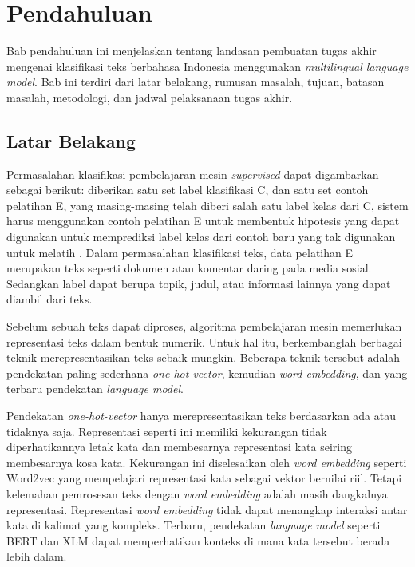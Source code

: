 \chapter{Pendahuluan}

Bab pendahuluan ini menjelaskan tentang landasan pembuatan tugas akhir mengenai klasifikasi teks berbahasa Indonesia menggunakan \textit{multilingual language model}. Bab ini terdiri dari latar belakang, rumusan masalah, tujuan, batasan masalah, metodologi, dan jadwal pelaksanaan tugas akhir.

\section{Latar Belakang}

Permasalahan klasifikasi pembelajaran mesin \textit{supervised} dapat digambarkan sebagai berikut: diberikan satu set label klasifikasi C, dan satu set contoh pelatihan E, yang masing-masing telah diberi salah satu label kelas dari C, sistem harus menggunakan contoh pelatihan E untuk membentuk hipotesis yang dapat digunakan untuk memprediksi label kelas dari contoh baru yang tak digunakan untuk melatih \parencite{mitchell_machine_1997}. Dalam permasalahan klasifikasi teks, data pelatihan E merupakan teks seperti dokumen atau komentar daring pada media sosial. Sedangkan label dapat berupa topik, judul, atau informasi lainnya yang dapat diambil dari teks.

Sebelum sebuah teks dapat diproses, algoritma pembelajaran mesin memerlukan representasi teks dalam bentuk numerik. Untuk hal itu, berkembanglah berbagai teknik merepresentasikan teks sebaik mungkin. Beberapa teknik tersebut adalah pendekatan paling sederhana \textit{one-hot-vector}, kemudian \textit{word embedding}, dan yang terbaru pendekatan \textit{language model}.

Pendekatan \textit{one-hot-vector} hanya merepresentasikan teks berdasarkan ada atau tidaknya saja. Representasi seperti ini memiliki kekurangan tidak diperhatikannya letak kata dan membesarnya representasi kata seiring membesarnya kosa kata. Kekurangan ini diselesaikan oleh \textit{word embedding} seperti Word2vec \parencite{MikolovWord2vec} yang mempelajari representasi kata sebagai vektor bernilai riil. Tetapi kelemahan pemrosesan teks dengan \textit{word embedding} adalah masih dangkalnya representasi. Representasi \textit{word embedding} tidak dapat menangkap interaksi antar kata di kalimat yang kompleks. Terbaru, pendekatan \textit{language model} seperti BERT \parencite{Devlin_Chang_Lee_Toutanova_2019} dan XLM \parencite{LampleConneau2019} dapat memperhatikan konteks di mana kata tersebut berada lebih dalam. 


